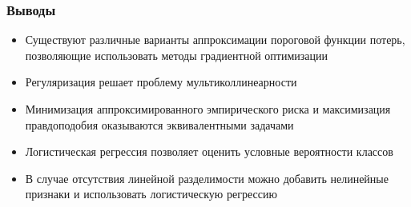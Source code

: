 \documentclass[unicode, notheorems]{beamer}
\begin{document}
\begin{frame}	
\frametitle{Выводы}
\begin{itemize}
	\item Существуют различные варианты аппроксимации пороговой функции потерь, позволяющие использовать методы градиентной оптимизации
	\item Регуляризация решает проблему мультиколлинеарности 
	\item Минимизация аппроксимированного эмпирического риска и максимизация правдоподобия оказываются эквивалентными задачами
	\item Логистическая регрессия позволяет оценить условные вероятности классов
	\item В случае отсутствия линейной разделимости можно добавить нелинейные признаки и использовать логистическую регрессию
\end{itemize}
\end{frame}
\end{document}
